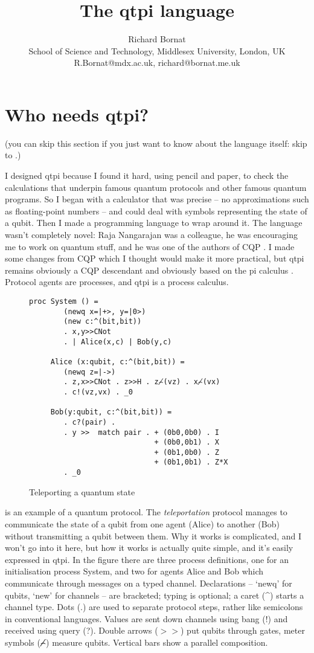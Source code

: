 \documentclass[11pt,a4paper]{article}
\title{The qtpi language}
\author{Richard Bornat \\ School of Science and Technology, Middlesex University, London, UK \\ R.Bornat@mdx.ac.uk, richard@bornat.me.uk}
\begin{document}
\newpage
\tableofcontents
\newpage
\section{Who needs qtpi?}

(you can skip this section if you just want to know about the language itself: skip to .)

I designed qtpi because I found it hard, using pencil and paper, to check the calculations that underpin famous quantum protocols and other famous quantum programs. So I began with a calculator that was precise -- no approximations such as floating-point numbers -- and could deal with symbols representing the state of a qubit. Then I made a programming language to wrap around it. The language wasn't completely novel: Raja Nangarajan was a colleague, he was encouraging me to work on quantum stuff, and he was one of the authors of CQP \citep{GaySJ:comqp}. I made some changes from CQP which I thought would make it more practical, but qtpi remains obviously a CQP descendant and obviously based on the pi calculus \citep{DBLP:journals/iandc/MilnerPW92a}. Protocol agents are processes, and qtpi is a process calculus. 

\begin{figure}
\centering
\begin{verbatim}
proc System () = 
        (newq x=|+>, y=|0>)  
        (new c:^(bit,bit))
        . x,y>>CNot 
        . | Alice(x,c) | Bob(y,c)

     Alice (x:qubit, c:^(bit,bit)) = 
        (newq z=|->) 
        . z,x>>CNot . z>>H . z⌢̸(vz) . x⌢̸(vx)
        . c!(vz,vx) . _0 

     Bob(y:qubit, c:^(bit,bit)) = 
        . c?(pair) . 
        . y >>  match pair . + (0b0,0b0) . I
                             + (0b0,0b1) . X
                             + (0b1,0b0) . Z
                             + (0b1,0b1) . Z*X 
        . _0
\end{verbatim}
\caption{Teleporting a quantum state}
\end{figure}

 is an example of a quantum protocol. The \emph{teleportation} protocol \citep{bbcjp:93}\citep{teleportwiki} manages to communicate the state of a qubit from one agent (Alice) to another (Bob) without transmitting a qubit between them. Why it works is complicated, and I won't go into it here, but how it works is actually quite simple, and it's easily expressed in qtpi. In the figure there are three process definitions, one for an initialisation process System, and two for agents Alice and Bob which communicate through messages on a typed channel. Declarations -- `newq' for qubits, `new' for channels -- are bracketed; typing is optional; a caret (\^{}) starts a channel type. Dots (.) are used to separate protocol steps, rather like semicolons in conventional languages. Values are sent down channels using bang (!) and received using query (?). Double arrows ($>\!>$) put qubits through gates, meter symbols (⌢̸) measure qubits. Vertical bars show a parallel composition. 
\end{document}
